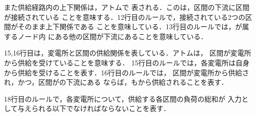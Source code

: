 また供給経路内の上下関係は，アトムで
表される．このは，区間の下流に区間が接続されている
ことを意味する．12行目のルールで，接続されている2つの区間がそのまま上下関係である
ことを意味している．13行目のルールでは，が属するノード内
にある他の区間が下流にあることを意味している．

15,16行目は，変電所と区間の供給関係を表している．アトムは，
区間が変電所から供給を受けていることを意味する．
15行目のルールでは，各変電所は自身から供給を受けることを表す．16行目のルールでは，
区間が変電所から供給され，かつ，区間がの下流にある
ならば，もから供給されることを表す．

18行目のルールで，各変電所について，供給する各区間の負荷の総和が
入力として与えられる以下でなければならないことを表す．


